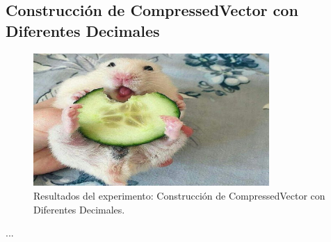 \subsection{Construcción de CompressedVector con Diferentes Decimales}
\label{exp:cvd-build-decimals}

\begin{figure}[H]
    \centering
    \includegraphics[width=0.8\textwidth]{testing/images/cvd_build_decimals.png}
    \caption{Resultados del experimento: Construcción de CompressedVector con Diferentes Decimales.}
    \label{fig:cvd-build-decimals}
\end{figure}

...
